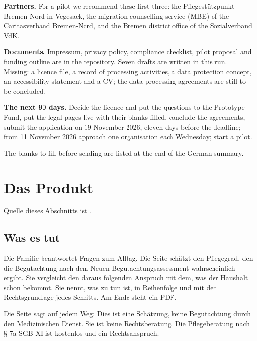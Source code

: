 \documentclass[10pt,parskip=half-]{scrartcl}
\begin{document}
\begin{otherlanguage}{english}
\textbf{Partners.} For a pilot we recommend these first three: the Pflegestützpunkt
Bremen-Nord in Vegesack, the migration counselling service (MBE) of the Caritasverband
Bremen-Nord, and the Bremen district office of the Sozialverband VdK.

\textbf{Documents.} Impressum, privacy policy, compliance checklist, pilot proposal and funding
outline are in the repository. Seven drafts are written in this run. Missing: a licence file,
a record of processing activities, a data protection concept, an accessibility statement and a
CV; the data processing agreements are still to be concluded.

\textbf{The next 90 days.} Decide the licence and put the questions to the Prototype Fund, put
the legal pages live with their blanks filled, conclude the agreements, submit the application
on 19 November 2026, eleven days before the deadline; from 11 November 2026 approach one
organisation each Wednesday; start a pilot.

The blanks to fill before sending are listed at the end of the German summary.
\end{otherlanguage}

\clearpage
\section{Das Produkt}

Quelle dieses Abschnitts ist .

\subsection{Was es tut}
Die Familie beantwortet Fragen zum Alltag. Die Seite schätzt den Pflegegrad, den die
Begutachtung nach dem Neuen Begutachtungsassessment wahrscheinlich ergibt. Sie vergleicht den
daraus folgenden Anspruch mit dem, was der Haushalt schon bekommt. Sie nennt, was zu tun ist,
in Reihenfolge und mit der Rechtsgrundlage jedes Schritts. Am Ende steht ein PDF.

Die Seite sagt auf jedem Weg: Dies ist eine Schätzung, keine Begutachtung durch den
Medizinischen Dienst. Sie ist keine Rechtsberatung. Die Pflegeberatung nach § 7a SGB XI ist
kostenlos und ein Rechtsanspruch.
\end{document}
